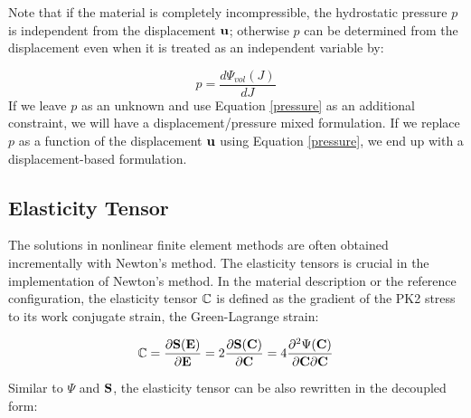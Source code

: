 Note that if the material is completely incompressible, the hydrostatic pressure $p$ is independent from the displacement $\bold{u}$; otherwise $p$ can be determined from the displacement even when it is treated as an independent variable by:

\begin{equation} \label{pressure}
p = \frac{d\Psi_{vol}(J)}{dJ}
\end{equation}
If we leave $p$ as an unknown and use Equation \ref{pressure} as an additional constraint, we will have a displacement/pressure mixed formulation. If we replace $p$ as a function of the displacement $\bold{u}$ using Equation \ref{pressure}, we end up with a displacement-based formulation.

%
\subsection{Elasticity Tensor} \label{general_elasticity}
The solutions in nonlinear finite element methods are often obtained incrementally with Newton's method. The elasticity tensors is crucial in the implementation of Newton's method.
In the material description or the reference configuration, the elasticity tensor $\mathbb{C}$ is defined as the gradient of the PK2 stress to its work conjugate strain, the Green-Lagrange strain:

\begin{equation}
\mathbb{C} = \frac{\partial{\bold{S}(\bold{E})}}{\partial{\bold{E}}} =  2\frac{\partial{\bold{S}(\bold{C})}} {\partial{\bold{C}}} = 4 \frac{\partial^2{\Psi(\bold{C})}}{{\partial{\bold{C}}}{\partial{\bold{C}}}} \label{def_elasticity_tensor}
\end{equation}

Similar to $\Psi$ and $\bold{S}$, the elasticity tensor can be also rewritten in the decoupled form: 

